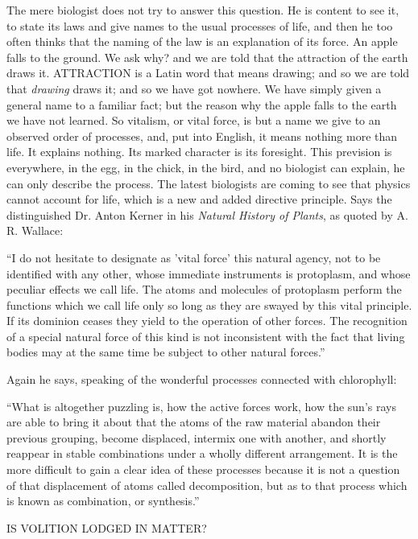 The mere biologist does not try to answer this question. He is content to see it, to state its
laws and give names to the usual processes of life, and then he too often thinks that the
naming of the law is an explanation of its force. An apple falls to the ground. We ask why?
and we are told that the attraction of the earth draws it. ATTRACTION is a Latin word that
means drawing; and so we are told that \textit{drawing} draws it; and so we have got nowhere. We
have simply given a general name to a familiar fact; but the reason why the apple falls to the
earth we have not learned. So vitalism, or vital force, is but a name we give to an observed
order of processes, and, put into English, it means nothing more than life. It explains nothing.
Its marked character is its foresight. This prevision is everywhere, in the egg, in the chick, in
the bird, and no biologist can explain, he can only describe the process. The latest biologists
are coming to see that physics cannot account for life, which is a new and added directive
principle. Says the distinguished Dr. Anton Kerner in his \textit{Natural History of Plants}, as
quoted by A. R. Wallace:

``I do not hesitate to designate as 'vital force' this natural agency, not to be identified with any
other, whose immediate instruments is protoplasm, and whose peculiar effects we call life.
The atoms and molecules of protoplasm perform the functions which we call life only so
long as they are swayed by this vital principle. If its dominion ceases they yield to the
operation of other forces. The recognition of a special natural force of this kind is not
inconsistent with the fact that living bodies may at the same time be subject to other natural
forces.''

Again he says, speaking of the wonderful processes connected with chlorophyll:

``What is altogether puzzling is, how the active forces work, how the sun's rays are able to
bring it about that the atoms of the raw material abandon their previous grouping, become
displaced, intermix one with another, and shortly reappear in stable combinations under a
wholly different arrangement. It is the more difficult to gain a clear idea of these processes
because it is not a question of that displacement of atoms called decomposition, but as to that
process which is known as combination, or synthesis.''

IS VOLITION LODGED IN MATTER?

